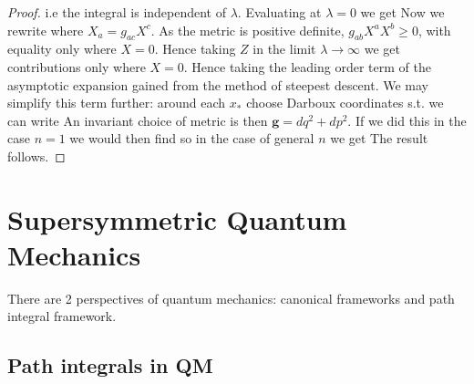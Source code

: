 \documentclass{article}
\begin{document}
\begin{proof}
{}
i.e the integral is independent of $\lambda$. Evaluating at $\lambda=0$ we get 
Now we rewrite 
where $X_a = g_{ac}X^c$. As the metric is positive definite, $g_{ab}X^a X^b \geq 0$, with equality only where $X=0$. Hence taking $Z$ in the limit $\lambda \to \infty$ we get contributions only where $X = 0$. Hence taking the leading order term of the asymptotic expansion gained from the method of steepest descent.
We may simplify this term further: around each $x_\ast$ choose Darboux coordinates s.t. we can write 
An invariant choice of metric is then $\bm{g} = dq^2 + dp^2$. If we did this in the case $n=1$ we would then find 
so in the case of general $n$ we get
The result follows. 
\end{proof}
\section{Supersymmetric Quantum Mechanics}
There are 2 perspectives of quantum mechanics: canonical frameworks and path integral framework. 
\subsection{Path integrals in QM}
\end{document}
